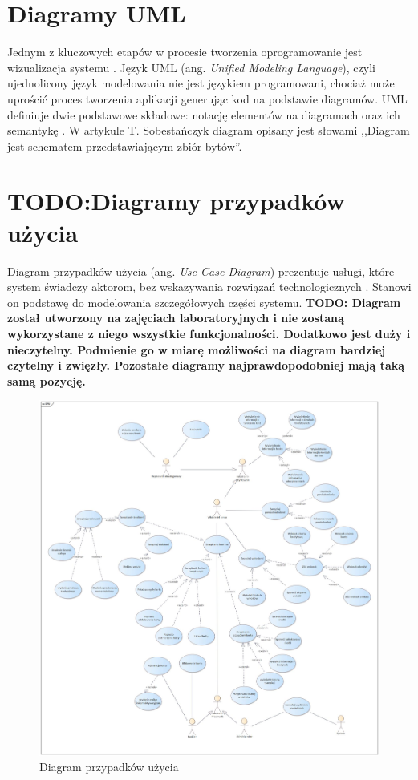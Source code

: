 \section{Diagramy UML}
Jednym z kluczowych etapów w procesie tworzenia oprogramowanie jest wizualizacja systemu \cite{UML}. Język UML (ang. \textit{Unified Modeling Language}), czyli ujednolicony język modelowania nie jest językiem programowani, chociaż może uprościć proces tworzenia aplikacji generując kod na podstawie diagramów. UML definiuje dwie podstawowe składowe: notację elementów na diagramach oraz ich semantykę \cite{UML1}. W artykule T. Sobestańczyk diagram opisany jest słowami ,,Diagram jest schematem przedstawiającym zbiór bytów''.
\section{TODO:Diagramy przypadków użycia}
Diagram przypadków użycia (ang. \textit{Use Case Diagram}) prezentuje usługi, które system świadczy aktorom, bez wskazywania rozwiązań technologicznych \cite{UML1}. Stanowi on podstawę do modelowania szczegółowych części systemu.
\textbf{TODO: Diagram został utworzony na zajęciach laboratoryjnych i nie zostaną wykorzystane z niego wszystkie funkcjonalności. Dodatkowo jest duży i nieczytelny. Podmienie go w miarę możliwości na diagram bardziej czytelny i zwięzły. Pozostałe diagramy najprawdopodobniej mają taką samą pozycję.}
\begin{figure}[H]
	\centering
	\includegraphics[width=1\textwidth]{images/DPU.jpg}
	\caption{Diagram przypadków użycia}
	\label{fig:UseCase}
\end{figure}
